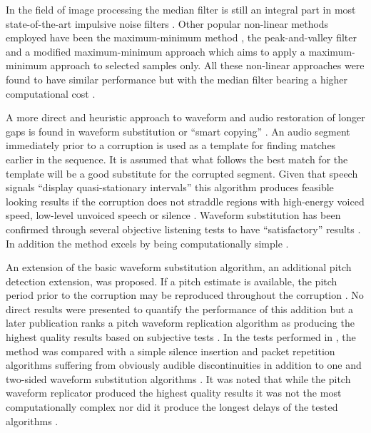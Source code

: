In the field of image processing the median filter is still an integral part in most state-of-the-art impulsive noise filters \cite{Alajlan2004}. Other popular non-linear methods employed have been the maximum-minimum method \cite{Xu1998}, the peak-and-valley filter\linebreak[2]\cite{Windyga2001} and a modified maximum-minimum approach \cite{Alajlan2004} which aims to apply a maximum-minimum approach to selected samples only. All these non-linear approaches were found to have similar performance but with the median filter bearing a higher computational cost \cite{Alajlan2004}.

A more direct and heuristic approach to waveform and audio restoration of longer gaps is found in waveform substitution \cite{Goodman1986} or ``smart copying'' \cite{Niediwiecki2001}. An audio segment immediately prior to a corruption is used as a template for finding matches earlier in the sequence. It is assumed that what follows the best match for the template will be a good substitute for the corrupted segment. Given that speech signals ``display quasi-stationary intervals'' \cite{Goodman1986} this algorithm produces feasible looking results if the corruption does not straddle regions with high-energy voiced speed, low-level unvoiced speech or silence \cite{Goodman1986}. Waveform substitution has been confirmed through several objective listening tests to have ``satisfactory'' results \cite{Niediwiecki2001}. In addition the method excels by being computationally simple \cite{Niediwiecki2001}.

An extension of the basic waveform substitution algorithm, an additional pitch detection extension, was proposed. If a pitch estimate is available, the pitch period prior to the corruption may be reproduced throughout the corruption \cite{Goodman1986}. No direct results were presented to quantify the performance of this addition but a later publication ranks a pitch waveform replication algorithm as producing the highest quality results based on subjective tests \cite{Wasem1988}. In the tests performed in \cite{Wasem1988}, the method was compared with a simple silence insertion and packet repetition algorithms suffering from obviously audible discontinuities \cite{Goodman1986} in addition to one and two-sided waveform substitution algorithms \cite{Goodman1986}. It was noted that while the pitch waveform replicator produced the highest quality results it was not the most computationally complex nor did it produce the longest delays of the tested algorithms \cite{Wasem1988}.


